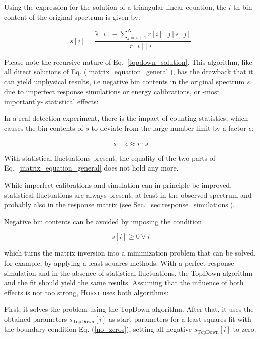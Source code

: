 \documentclass{article}
\begin{document}
\noindent Using the expression for the solution of a triangular linear equation, the $i$-th bin content of the original spectrum is given by:

\begin{equation}
	\label{topdown_solution}
	s[i] = \frac{\tilde{s}[i] - \sum_{j = i+1}^{N} r[i][j] s[j]}{r[i][i]}
\end{equation}

\noindent Please note the recursive nature of Eq.~\eqref{topdown_solution}.
This algorithm, like all direct solutions of Eq. (\ref{matrix_equation_general}), has the drawback that it can yield unphysical results, i.e negative bin contents in the original spectrum $s$, due to imperfect response simulations or energy calibrations, or -most importantly- statistical effects:


\noindent In a real detection experiment, there is the impact of counting statistics, which causes the bin contents of $\tilde{s}$ to deviate from the large-number limit by a factor $\epsilon$:

\begin{equation}
	\label{matrix_equation_statistics}
	\tilde{s} + \epsilon \approx r \cdot s
\end{equation}

\noindent With statistical fluctuations present, the equality of the two parts of Eq.~\eqref{matrix_equation_general} does not hold any more.

\noindent While imperfect calibrations and simulation can in principle be improved, statistical fluctuations are always present, at least in the observed spectrum and probably also in the response matrix (see Sec.~\ref{sec:response_simulations}).

\noindent Negative bin contents can be avoided by imposing the condition

\begin{equation}
	\label{no_zeros}
	s[i] \geq 0 ~ \forall ~ i
\end{equation}

\noindent which turns the matrix inversion into a minimization problem that can be solved, for example, by applying a least-squares methods.
With a perfect response simulation and in the absence of statistical fluctuations, the TopDown algorithm and the fit should yield the same results.
Assuming that the influence of both effects is not too strong, \textsc{Horst} uses both algorithms: 

\noindent First, it solves the problem using the TopDown algorithm. After that, it uses the obtained parameters $s_\mathrm{TopDown}[i]$ as start parameters for a least-squares fit with the boundary condition Eq. (\ref{no_zeros}), setting all negative $s_\mathrm{TopDown}[i]$ to zero.
\end{document}
